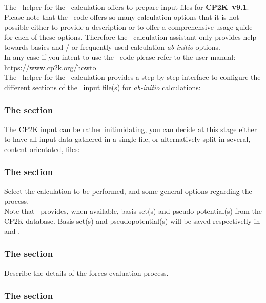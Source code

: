 The \atomes\ helper for the \cptk\ calculation offers to prepare input files for {\bf{CP2K~v9.1}}. 
Please note that the \cptk\ code offers so many calculation options that it is not possible either to provide a description 
or to offer a comprehensive usage guide for each of these options.  
Therefore the \cptk\ calculation assistant only provides help towards basics and / or frequently used calculation {\it{ab-initio}} options. \\[0.25cm]
In any case if you intent to use the \cptk\ code please refer to the user manual: \\[0.25cm]
\href{https://www.cp2k.org/howto}{https://www.cp2k.org/howto}\\[0.25cm]
The \atomes\ helper for the \cptk\ calculation provides a step by step interface to configure the different sections of the \cptk\ input file(s) for {\it{ab-initio}} calculations:

\subsubsection*{The  section}

The CP2K input can be rather initimidating, you can decide at this stage either to have all input data gathered in a single file, 
or alternatively split in several, content orientated, files:  

\subsubsection*{The  section}

Select the calculation to be performed, and some general options regarding the process. \\
Note that \atomes\ provides, when available, basis set(s) and pseudo-potential(s) from the CP2K database. 
Basis set(s) and pseudopotential(s) will be saved respectivelly in  and . 

\subsubsection*{The  section}

Describe the details of the forces evaluation process.

\subsubsection*{The  section}

